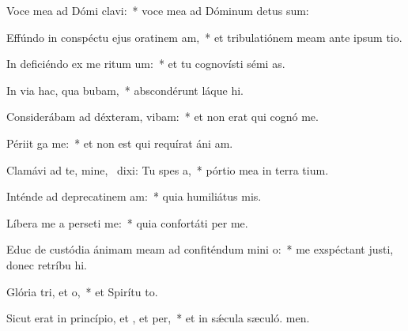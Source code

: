 \item Voce mea ad Dómi clavi:~* voce mea ad Dóminum detus sum:
\item Effúndo in conspéctu ejus oratinem am,~* et tribulatiónem meam ante ipsum tio.
\item In deficiéndo ex me ritum um:~* et tu cognovísti sémi as.
\item In via hac, qua bubam,~* abscondérunt láque hi.
\item Considerábam ad déxteram,  vibam:~* et non erat qui cognó me.
\item Périit ga  me:~* et non est qui requírat áni am.
\item Clamávi ad te, mine,~\pscross{} dixi: Tu  spes a,~* pórtio mea in terra tium.
\item Inténde ad deprecatinem am:~* quia humiliátus  mis.
\item Líbera me a perseti me:~* quia confortáti  per me.
\item Educ de custódia ánimam meam ad confiténdum mini o:~* me exspéctant justi, donec retríbu hi.
\item Glória tri, et o,~* et Spirítu to.
\item Sicut erat in princípio, et , et per,~* et in sǽcula sæculó. men.
